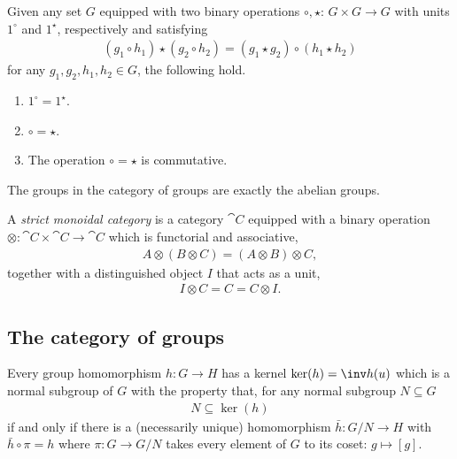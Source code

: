 \documentclass{article}
\begin{document}
\begin{proposition}[Awodey p. 78]
    Given any set $G$ equipped with two binary operations $\circ,\star$:
    $G\times G\to G$ with units $1^\circ$ and $1^\star$, respectively and
    satisfying
    \begin{align*}
        (g_1 \circ h_1)\star (g_2\circ h_2) = (g_1\star g_2) \circ (h_1\star h_2)
    \end{align*}
    for any $g_1, g_2, h_1, h_2\in G$, the following hold.
    \begin{enumerate}
        \item $1^\circ = 1^\star$.
        \item $\circ = \star$.
        \item The operation $\circ = \star$ is commutative.
    \end{enumerate}
\end{proposition}

\begin{corollary}[Awodey p. 79]
    The groups in the category of groups are exactly the abelian groups. 
\end{corollary}

\begin{definition}[Awodey p. 79]
    A \emph{strict monoidal category} is a category $\cat C$ equipped with a
    binary operation $\otimes:\cat C\times \cat C\to \cat C$ which is functorial
    and associative,
    \begin{align*}
        A\otimes(B\otimes C) = (A\otimes B)\otimes C,
    \end{align*}
    together with a distinguished object $I$ that acts as a unit,
    \begin{align*}
        I\otimes C = C = C \otimes I.
    \end{align*}
\end{definition}

\subsection{The category of groups}

\begin{theorem}[Awodey p. 83]
    Every group homomorphism $h:G\to H$ has a kernel $\ker(h)=\inv h(u)$
    which is a normal subgroup of $G$ with the property that, for any normal
    subgroup $N\subseteq G$ 
    \begin{align*}
        N\subseteq \ker(h)
    \end{align*}
    if and only if there is a (necessarily unique) homomorphism
    $\bar h:G/N\to H$ with $\bar h \circ \pi = h$ where 
    $\pi:G\to G/N$ takes every element of $G$ to its
    coset: $g\mapsto [g]$.
\end{theorem}
\end{document}
